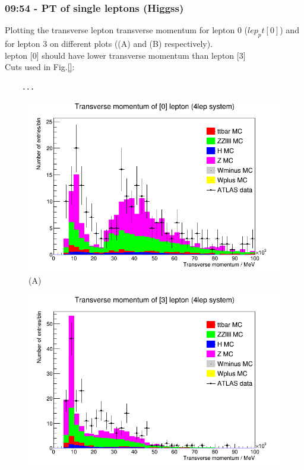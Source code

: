 \subsubsection*{09:54 - PT of single leptons (Higgss)}
Plotting the transverse lepton transverse momentum for lepton 0 ($lep_pt[0]$) and for lepton 3 on different plots ((A) and (B) respectively).
\\
lepton [0] should have lower transverse momentum than lepton [3]
\\
Cuts used in Fig.\ref{}:
\begin{lstlisting}
    ...
\end{lstlisting}
\begin{figure}[h!]
    \centering
    \begin{minipage}{0.5\textwidth}
        \centering
        \includegraphics[width=\linewidth]{plots/05-03-2021/09-54_05-03.png}
        (A)
    \end{minipage}\hfill
    \begin{minipage}{0.5\textwidth}
        \centering
        \includegraphics[width=\linewidth]{plots/05-03-2021/10-32_05-03-21.png}

\end{minipage}
\end{figure}
